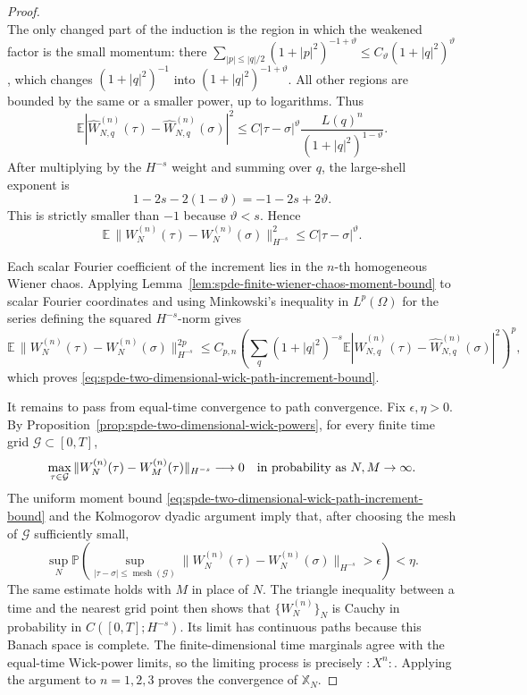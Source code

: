 \begin{proof}
\begin{equation}
\end{equation}
The only changed part of the induction is the region in which the weakened
factor is the small momentum: there
\(\sum_{|p|\leq |q|/2}(1+|p|^2)^{-1+\vartheta}\leq
C_\vartheta(1+|q|^2)^\vartheta\), which changes
\((1+|q|^2)^{-1}\) into \((1+|q|^2)^{-1+\vartheta}\).  All other regions
are bounded by the same or a smaller power, up to logarithms.  Thus
\begin{equation}
  \mathbb E\left|
    \widehat W_{N,q}^{(n)}(\tau)
    -
    \widehat W_{N,q}^{(n)}(\sigma)
  \right|^2
  \leq
  C|\tau-\sigma|^\vartheta
  \frac{L(q)^n}{(1+|q|^2)^{1-\vartheta}} .
  \label{eq:spde-wick-time-increment-fourier-bound}
\end{equation}
After multiplying by the \(H^{-s}\) weight and summing over \(q\), the
large-shell exponent is
\[
  1-2s-2(1-\vartheta)=-1-2s+2\vartheta .
\]
This is strictly smaller than \(-1\) because \(\vartheta<s\).  Hence
\[
  \mathbb E\,
  \|W_N^{(n)}(\tau)-W_N^{(n)}(\sigma)\|_{H^{-s}}^{2}
  \leq
  C|\tau-\sigma|^\vartheta .
\]

Each scalar Fourier coefficient of the increment lies in the \(n\)-th
homogeneous Wiener chaos.  Applying
Lemma~\ref{lem:spde-finite-wiener-chaos-moment-bound} to scalar Fourier
coordinates and using Minkowski's inequality in
\(L^p(\Omega)\) for the series defining the squared \(H^{-s}\)-norm gives
\[
  \mathbb E\,
  \|W_N^{(n)}(\tau)-W_N^{(n)}(\sigma)\|_{H^{-s}}^{2p}
  \leq
  C_{p,n}
  \left(
    \sum_q(1+|q|^2)^{-s}
    \mathbb E\left|
      \widehat W_{N,q}^{(n)}(\tau)
      -
      \widehat W_{N,q}^{(n)}(\sigma)
    \right|^2
  \right)^p ,
\]
which proves \eqref{eq:spde-two-dimensional-wick-path-increment-bound}.

It remains to pass from equal-time convergence to path convergence.  Fix
\(\epsilon,\eta>0\).  By
Proposition~\ref{prop:spde-two-dimensional-wick-powers}, for every finite
time grid \(\mathcal G\subset[0,T]\),
\[
  \max_{\tau\in\mathcal G}
  \|W_N^{(n)}(\tau)-W_M^{(n)}(\tau)\|_{H^{-s}}
  \longrightarrow0
  \quad\hbox{in probability as }N,M\to\infty .
\]
The uniform moment bound
\eqref{eq:spde-two-dimensional-wick-path-increment-bound} and the
Kolmogorov dyadic argument imply that, after choosing the mesh of
\(\mathcal G\) sufficiently small,
\[
  \sup_N
  \mathbb P\!\left(
    \sup_{|\tau-\sigma|\leq\operatorname{mesh}(\mathcal G)}
    \|W_N^{(n)}(\tau)-W_N^{(n)}(\sigma)\|_{H^{-s}}
    >\epsilon
  \right)
  <\eta .
\]
The same estimate holds with \(M\) in place of \(N\).  The triangle
inequality between a time and the nearest grid point then shows that
\(\{W_N^{(n)}\}_N\) is Cauchy in probability in
\(C([0,T];H^{-s})\).  Its limit has continuous paths because this Banach
space is complete.  The finite-dimensional time marginals agree with the
equal-time Wick-power limits, so the limiting process is precisely
\(:\!X^n\!:\).  Applying the argument to \(n=1,2,3\) proves the convergence
of \(\mathbb X_N\).
\end{proof}

